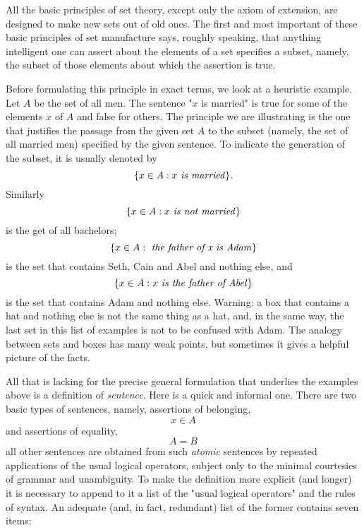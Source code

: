 
All the basic principles of set theory, except only the axiom of extension, are designed to make new sets out of old ones. The first and most important of these basic principles of set manufacture says, roughly speaking, that anything intelligent one can assert about the elements of a set specifies a subset, namely, the subset of those elements about which the assertion is true.

Before formulating this principle in exact terms, we look at a heuristic example. Let $A$ be the set of all men. The sentence "$x$ is married" is true for some of the elements $x$ of $A$ and false for others. The principle we are illustrating is the one that justifies the passage from the given set $A$ to the subset (namely, the set of all married men) specified by the given sentence. To indicate the generation of the subset, it is usually denoted by 
\begin{equation*}
\{ x \in A: x \text{ \textit{is married}} \}.
\end{equation*}
Similarly 
\begin{equation*}
\{ x \in A: x \text{ \textit{is not married}} \}
\end{equation*}
is the get of all bachelors; 
\begin{equation*}
\{ x \in A: \text{ \textit{the father of x is Adam}} \} 
\end{equation*}
is the set that contains Seth, Cain and Abel and nothing else, and
\begin{equation*}
\{ x \in A: x \text{ \textit{is the father of Abel}} \}  
\end{equation*}
is the set that contains Adam and nothing else. Warning: a box that contains a hat and nothing else is not the same thing as a hat, and, in the same way, the last set in this list of examples is not to be confused with Adam. The analogy between sets and boxes has many weak points, but sometimes it gives a helpful picture of the facts. 

All that is lacking for the precise general formulation that underlies the examples above is a definition of \textit{sentence}. Here is a quick and informal one. There are two basic types of sentences, namely, assertions of belonging,
\begin{equation*}
x \in A
\end{equation*}
and assertions of equality, 
\begin{equation*}
A = B
\end{equation*}
all other sentences are obtained from such \textit{atomic} sentences by repeated applications of the usual logical operators, subject only to the minimal courtesies of grammar and unambiguity. To make the definition more explicit (and longer) it is necessary to append to it a list of the "usual logical operators" and the rules of syntax. An adequate (and, in fact, redundant) list of the former contains seven items:

